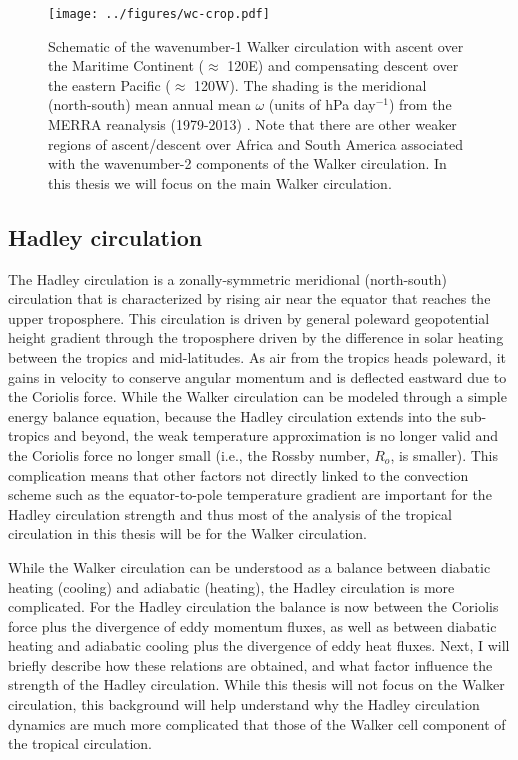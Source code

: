 \documentclass[letterpaper,12pt,titlepage,oneside,final]{book}
\begin{document}
\begin{figure}[H]
\centering
\noindent\texttt{[image: ../figures/wc-crop.pdf]}\hfill
\caption{Schematic of the wavenumber-1 Walker circulation with ascent over the Maritime Continent ($\approx$ 120E) and compensating descent over the eastern Pacific ($\approx$ 120W). The shading is the meridional (north-south) mean annual mean $\omega$ (units of hPa day$^{-1}$) from the MERRA reanalysis (1979-2013) \citep{rienecker_merra:_2011}. Note that there are other weaker regions of ascent/descent over Africa and South America associated with the wavenumber-2 components of the Walker circulation. In this thesis we will focus on the main Walker circulation.}
\label{fig:WC}
\end{figure}

\subsection{Hadley circulation}\label{HC}

The Hadley circulation is a zonally-symmetric meridional (north-south) circulation that is characterized by rising air near the equator that reaches the upper troposphere. This circulation is driven by general poleward geopotential height gradient through the troposphere driven by the difference in solar heating between the tropics and mid-latitudes. As air from the tropics heads poleward, it gains in velocity to conserve angular momentum and is deflected eastward due to the Coriolis force. While the Walker circulation can be modeled through a simple energy balance equation, because the Hadley circulation extends into the sub-tropics and beyond, the weak temperature approximation is no longer valid and the Coriolis force no longer small (i.e., the Rossby number, $R_{o}$, is smaller). This complication means that other factors not directly linked to the convection scheme such as the equator-to-pole temperature gradient are important for the Hadley circulation strength and thus most of the analysis of the tropical circulation in this thesis will be for the Walker circulation.

While the Walker circulation can be understood as a balance between diabatic heating (cooling) and adiabatic (heating), the Hadley circulation is more complicated. For the Hadley circulation the balance is now between the Coriolis force plus the divergence of eddy momentum fluxes, as well as between diabatic heating and adiabatic cooling plus the divergence of eddy heat fluxes. Next, I will briefly describe how these relations are obtained, and what factor influence the strength of the Hadley circulation. While this thesis will not focus on the Walker circulation, this background will help understand why the Hadley circulation dynamics are much more complicated that those of the Walker cell component of the tropical circulation.
\end{document}
